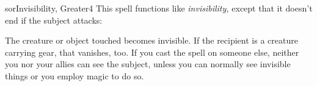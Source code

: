 
\begin{spellcard}{sor}{Invisibility, Greater}{4}
  \newcommand{\name}{Invisibility, Greater}
  \newcommand{\school}{illusion}
  \newcommand{\subschool}{glamer}
  \newcommand{\descriptor}{NULL}
  \newcommand{\spelllevel}{4}
  \newcommand{\castingtime}{1 standard action}
  \newcommand{\components}{V, S}
  \newcommand{\costlycomponents}{0}
  \newcommand{\range}{personal or touch}
  \newcommand{\area}{NULL}
  \newcommand{\effect}{NULL}
  \newcommand{\targets}{NULL}%
  \newcommand{\duration}{1 round/level}
  \newcommand{\dismissible}{1}
  \newcommand{\shapeable}{0}
  \newcommand{\savingthrow}{Will negates (harmless)}
  \newcommand{\spellresistance}{yes (harmless)}
  \newcommand{\source}{PFRPG Core}
  \newcommand{\verbal}{1}
  \newcommand{\somatic}{1}
  \newcommand{\material}{0}
  \newcommand{\focus}{0}
  \newcommand{\divinefocus}{0}
  \newcommand{\deity}{NULL}
  \newcommand{\SLALevel}{4}
  \newcommand{\domain}{NULL}
  \newcommand{\acid}{0}
  \newcommand{\air}{0}
  \newcommand{\chaotic}{0}
  \newcommand{\cold}{0}
  \newcommand{\curse}{0}
  \newcommand{\darkness}{0}
  \newcommand{\death}{0}
  \newcommand{\disease}{0}
  \newcommand{\earth}{0}
  \newcommand{\electricity}{0}
  \newcommand{\emotion}{0}
  \newcommand{\evil}{0}
  \newcommand{\fear}{0}
  \newcommand{\fire}{0}
  \newcommand{\force}{0}
  \newcommand{\good}{0}
  \newcommand{\languagedependent}{0}
  \newcommand{\lawful}{0}
  \newcommand{\light}{0}
  \newcommand{\mindaffecting}{0}
  \newcommand{\pain}{0}
  \newcommand{\poison}{0}
  \newcommand{\shadow}{0}
  \newcommand{\sonic}{0}
  \newcommand{\water}{0}
  \newcommand{\linktext}{Invisibility, Greater}
  \newcommand{\id}{299}
  \newcommand{\materialcosts}{NULL}
  \newcommand{\bloodline}{NULL}
  \newcommand{\patron}{NULL}
  \newcommand{\mythictext}{NULL}
  \newcommand{\augmented}{NULL}
  \newcommand{\hauntstatistics}{NULL}
  \newcommand{\ruse}{0}
  \newcommand{\draconic}{0}
  \newcommand{\meditative}{0}
  \spellcardinfo[0.55]{}
  This spell functions like \emph{invisibility,} except that it doesn't
  end if the subject attacks:

  The creature or object touched becomes invisible. If the recipient is a
  creature carrying gear, that vanishes, too. If you cast the spell on
  someone else, neither you nor your allies can see the subject, unless
  you can normally see invisible things or you employ magic to do so.


\end{spellcard}
